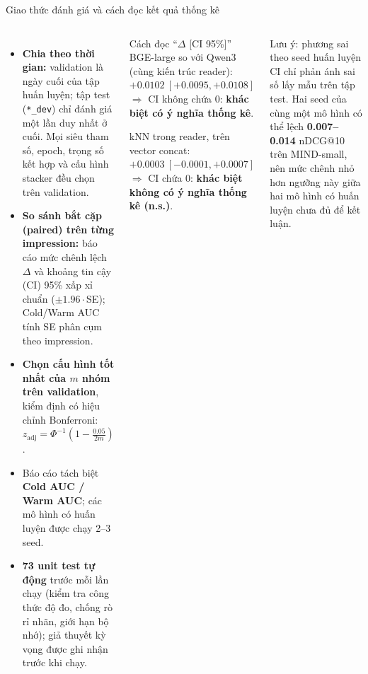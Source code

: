 \documentclass[aspectratio=169,t]{beamer}
\newcommand{\code}[1]{\texttt{#1}}
\begin{document}
\begin{frame}[shrink]{Giao thức đánh giá và cách đọc kết quả thống kê}
\begin{columns}[T,onlytextwidth]
\scriptsize
\begin{itemize}
  \setlength{\itemsep}{3pt}
  \item \textbf{Chia theo thời gian:} validation là ngày cuối của tập huấn luyện; tập test (\code{*\_dev}) chỉ đánh giá một lần duy nhất ở cuối. Mọi siêu tham số, epoch, trọng số kết hợp và cấu hình stacker đều chọn trên validation.
  \item \textbf{So sánh bắt cặp (paired) trên từng impression:} báo cáo mức chênh lệch $\Delta$ và khoảng tin cậy (CI) 95\% xấp xỉ chuẩn ($\pm1.96\cdot$SE); Cold/Warm AUC tính SE phân cụm theo impression.
  \item \textbf{Chọn cấu hình tốt nhất của $m$ nhóm trên validation}, kiểm định có hiệu chỉnh Bonferroni: $z_{\mathrm{adj}}=\Phi^{-1}\!\left(1-\frac{0.05}{2m}\right)$.
  \item Báo cáo tách biệt \textbf{Cold AUC / Warm AUC}; các mô hình có huấn luyện được chạy 2--3 seed.
  \item \textbf{73 unit test tự động} trước mỗi lần chạy (kiểm tra công thức độ đo, chống rò rỉ nhãn, giới hạn bộ nhớ); giả thuyết kỳ vọng được ghi nhận trước khi chạy.
\end{itemize}
\begin{exampleblock}{Cách đọc ``$\Delta$ [CI 95\%]''}
\scriptsize
BGE-large so với Qwen3 (cùng kiến trúc reader):\\
\quad $+0.0102\ [+0.0095, +0.0108]$ \;$\Rightarrow$ CI không chứa 0: \textbf{khác biệt có ý nghĩa thống kê}.\par\vspace{3pt}
kNN trong reader, trên vector concat:\\
\quad $+0.0003\ [-0.0001, +0.0007]$ \;$\Rightarrow$ CI chứa 0: \textbf{khác biệt không có ý nghĩa thống kê (n.s.)}.
\end{exampleblock}
\begin{alertblock}{Lưu ý: phương sai theo seed huấn luyện}
\scriptsize CI chỉ phản ánh sai số lấy mẫu trên tập test. Hai seed của cùng một mô hình có thể lệch \textbf{0.007--0.014} nDCG@10 trên MIND-small, nên mức chênh nhỏ hơn ngưỡng này giữa hai mô hình có huấn luyện chưa đủ để kết luận.
\end{alertblock}
\end{columns}
\par\kern0pt%
\end{frame}
\end{document}
